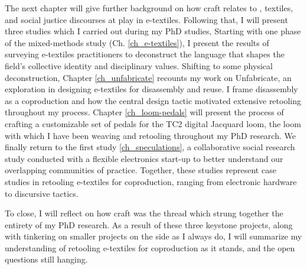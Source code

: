 The next chapter will give further background on how craft relates to , textiles, and social justice discourses at play in e-textiles. Following that, I will present three studies which I carried out during my PhD studies, 
Starting with one phase of the mixed-methods study (Ch. \ref{ch_e-textiles}), I present the results of surveying e-textiles practitioners to deconstruct the language that shapes the field's collective identity and disciplinary values. Shifting to some physical deconstruction, Chapter \ref{ch_unfabricate} recounts my work on Unfabricate, an exploration in designing e-textiles for disassembly and reuse. I frame disassembly as a coproduction and how the central design tactic motivated extensive retooling throughout my process. Chapter \ref{ch_loom-pedals} will present the process of crafting a customizable set of pedals for the TC2 digital Jacquard loom, the loom with which I have been weaving and retooling throughout my PhD research. We finally return to the first study \ref{ch_speculations}, a collaborative social research study conducted with a flexible electronics start-up to better understand our overlapping communities of practice. Together, these studies represent case studies in retooling e-textiles for coproduction, ranging from electronic hardware to discursive tactics.

To close, I will reflect on how craft was the thread which strung together the entirety of my PhD research. As a result of these three keystone projects, along with tinkering on smaller projects on the side as I always do, I will summarize my understanding of retooling e-textiles for coproduction as it stands, and the open questions still hanging.




